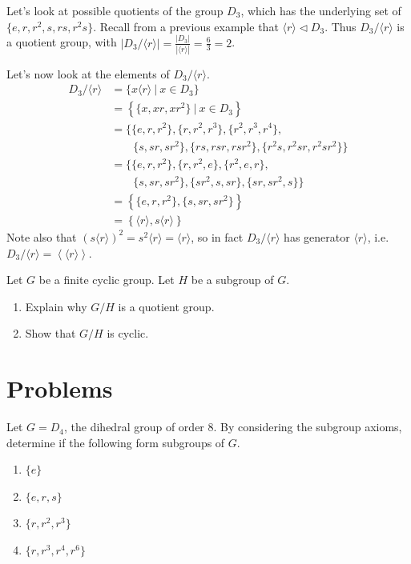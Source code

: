 \begin{example}
    Let's look at possible quotients of the group $D_3$, which has the underlying set of $\{e, r, r^2, s, rs, r^2s\}$. Recall from a previous example that $\langle r \rangle \lhd D_3$. Thus $D_3 / \langle r \rangle$ is a quotient group, with $|D_3 / \langle r \rangle| = \frac{|D_3|}{|\langle r\rangle|} = \frac63 = 2$.

    Let's now look at the elements of $D_3 / \langle r \rangle$.
    \begin{align*}
        D_3 / \langle r \rangle  &= \{x\langle r \rangle \ | \ x \in D_3\}\\
        &= \left\{\{x, xr, xr^2\} \ | \ x \in D_3\right\}\\
        &= \{\{e, r, r^2\}, \{r, r^2, r^3\}, \{r^2, r^3, r^4\}, \\ &\quad\quad \{s, sr, sr^2\}, \{rs, rsr, rsr^2\}, \{r^2s, r^2sr, r^2sr^2\}\}\\
        &= \{\{e, r, r^2\}, \{r, r^2, e\}, \{r^2, e, r\}, \\ &\quad\quad \{s, sr, sr^2\}, \{sr^2, s, sr\}, \{sr, sr^2, s\}\}\\
        &= \left\{\{e, r, r^2\}, \{s, sr, sr^2\}\right\}\\
        &= \left\{\langle r\rangle, s\langle r \rangle\right\}
    \end{align*}
    Note also that $(s\langle r \rangle)^2 = s^2\langle r \rangle = \langle r\rangle$, so in fact $D_3 / \langle r \rangle$ has generator $\langle r \rangle$, i.e. $D_3 / \langle r \rangle = \left\langle \langle r \rangle \right \rangle$.
\end{example}

\begin{exercise}\label{exercise-quotient-group-of-cyclic-group-is-cyclic}
    Let $G$ be a finite cyclic group. Let $H$ be a subgroup of $G$.
    \begin{enumerate}[label=(\roman*)]
        \item Explain why $G/H$ is a quotient group.
        \item Show that $G/H$ is cyclic.
    \end{enumerate}    
\end{exercise}

\newpage

\section{Problems}
\begin{problem}
    Let $G = D_4$, the dihedral group of order 8. By considering the subgroup axioms, determine if the following form subgroups of $G$.
    \begin{enumerate}[label=(\alph*)]
        \item $\{e\}$
        \item $\{e, r, s\}$
        \item $\{r, r^2, r^3\}$
        \item $\{r, r^3, r^4, r^6\}$
    \end{enumerate}
\end{problem}

